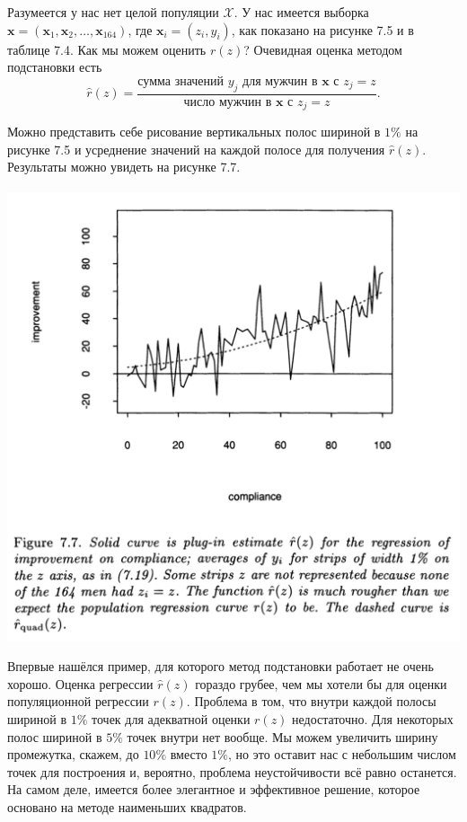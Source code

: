  Разумеется у нас нет целой популяции $\mathcal X$. У нас имеется выборка $\mathbf x = (\mathbf x_1, \mathbf x_2, \ldots, \mathbf x_{164})$, где $\mathbf x_i = (z_i, y_i)$, как показано на рисунке 7.5 и в таблице 7.4. Как мы можем оценить $r(z)$? Очевидная оценка методом подстановки есть
 \begin{equation}
  \hat r(z) = \frac{\text{сумма значений $y_j$ для мужчин в $\mathbf x$ с $z_j = z$}}{\text{число мужчин в $\mathbf x$ с $z_j = z$}}.
\end{equation}

Можно представить себе рисование вертикальных полос шириной в $1\%$ на рисунке 7.5 и усреднение значений на каждой полосе для получения $\hat r(z).$ Результаты можно увидеть на рисунке 7.7.
\\~\\
\noindent
\includegraphics[width=0.9\linewidth]{6/f77.png}
\newline
\setcounter{figure}{7}

Впервые нашёлся пример, для которого метод подстановки работает не очень хорошо. Оценка регрессии $\hat r(z)$ гораздо грубее, чем мы хотели бы для оценки популяционной регрессии $r(z)$. Проблема в том, что внутри каждой полосы шириной в $1\%$ точек для адекватной оценки $r(z)$ недостаточно. Для некоторых полос шириной в $5\%$ точек внутри нет вообще. Мы можем увеличить ширину промежутка, скажем, до $10\%$ вместо $1\%$, но это оставит нас с небольшим числом точек для построения и, вероятно, проблема неустойчивости всё равно останется. На самом деле, имеется более элегантное и эффективное решение, которое основано на методе наименьших квадратов.

